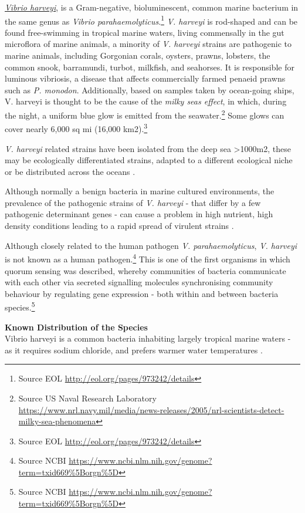 \documentclass[openany]{book}
\let\rmarkdownfootnote\footnote%
\def\footnote{\protect\rmarkdownfootnote}
\theoremstyle{definition}
\theoremstyle{definition}
\theoremstyle{definition}
\theoremstyle{remark}
\begin{document}
\href{http://eol.org/pages/973242/details}{\emph{Vibrio harveyi}}, is a
Gram-negative, bioluminescent, common marine bacterium in the same genus
as \emph{Vibrio parahaemolyticus}.\footnote{Source EOL
  \url{http://eol.org/pages/973242/details}} \emph{V. harveyi} is
rod-shaped and can be found free-swimming in tropical marine waters,
living commensally in the gut microflora of marine animals, a minority
of \emph{V. harveyi} strains are pathogenic to marine animals, including
Gorgonian corals, oysters, prawns, lobsters, the common snook,
barramundi, turbot, milkfish, and seahorses. It is responsible for
luminous vibriosis, a disease that affects commercially farmed penaeid
prawns such as \emph{P. monodon}. Additionally, based on samples taken
by ocean-going ships, V. harveyi is thought to be the cause of the
\emph{milky seas effect}, in which, during the night, a uniform blue
glow is emitted from the seawater.\footnote{Source US Naval Research
  Laboratory
  \url{https://www.nrl.navy.mil/media/news-releases/2005/nrl-scientists-detect-milky-sea-phenomena}}
Some glows can cover nearly 6,000 sq mi (16,000 km2).\footnote{Source
  EOL \url{http://eol.org/pages/973242/details}}

\emph{V. harveyi} related strains have been isolated from the deep sea
\textgreater{}1000m2, these may be ecologically differentiated strains,
adapted to a different ecological niche or be distributed across the
oceans \citep{Hasan_2015}.

Although normally a benign bacteria in marine cultured environments, the
prevalence of the pathogenic strains of \emph{V. harveyi} - that differ
by a few pathogenic determinant genes - can cause a problem in high
nutrient, high density conditions leading to a rapid spread of virulent
strains \citep{Ben_Haim_2003}.

Although closely related to the human pathogen \emph{V.
parahaemolyticus}, \emph{V. harveyi} is not known as a human
pathogen.\footnote{Source NCBI
  \url{https://www.ncbi.nlm.nih.gov/genome?term=txid669\%5Borgn\%5D}}
This is one of the first organisms in which quorum sensing was
described, whereby communities of bacteria communicate with each other
via secreted signalling molecules synchronising community behaviour by
regulating gene expression - both within and between bacteria
species.\footnote{Source NCBI
  \url{https://www.ncbi.nlm.nih.gov/genome?term=txid669\%5Borgn\%5D}}

\textbf{Known Distribution of the Species}\\
Vibrio harveyi is a common bacteria inhabiting largely tropical marine
waters - as it requires sodium chloride, and prefers warmer water
temperatures \citep{Austin_2006}.
\end{document}
